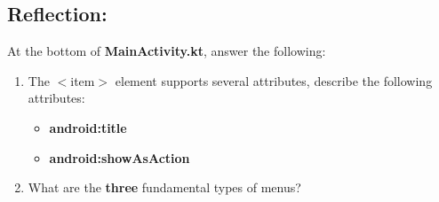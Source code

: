 \documentclass{article}
\begin{document}
\subsection*{Reflection:}
At the bottom of \textbf{MainActivity.kt}, answer the following:
\begin{enumerate}
	\item The $<$item$>$ element supports several attributes, describe the following attributes:
	      \begin{itemize}
		      \item \textbf{android:title}
		      \item \textbf{android:showAsAction}
	      \end{itemize}
	\item What are the \textbf{three} fundamental types of menus?
\end{enumerate}
\end{document}
